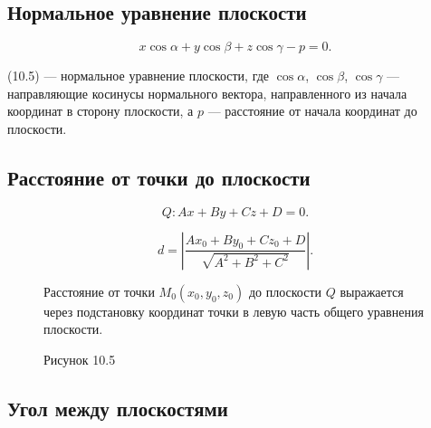\documentclass[12pt,a4paper]{article}
\begin{document}
\subsection*{\textbf{Нормальное уравнение плоскости}}

\begin{equation}
  x\cos\alpha+y\cos\beta+z\cos\gamma-p=0. \tag{10.5}
\end{equation}

(10.5) --- нормальное уравнение плоскости, где $\cos\alpha$, $\cos\beta$,
$\cos\gamma$ --- направляющие косинусы нормального вектора,
направленного из начала координат в сторону плоскости, а $p$ ---
расстояние от начала координат до плоскости.

\subsection*{\textbf{Расстояние от точки до плоскости}}

$$
Q:Ax+By+Cz+D=0.
$$

\begin{equation}
  d=\left|\frac{Ax_0+By_0+Cz_0+D}{\sqrt{A^2+B^2+C^2}}\right|. \tag{10.5a}
\end{equation}

\begin{figure}[H]
  \centering
  \begin{minipage}{0.4\textwidth}
    \centering
    \caption*{Рисунок 10.5}
  \end{minipage}%
  \begin{minipage}{0.55\textwidth}
    Расстояние от точки $M_0(x_0,y_0,z_0)$ до плоскости $Q$ выражается
    через подстановку координат точки в левую часть общего уравнения
    плоскости.
  \end{minipage}
\end{figure}

\subsection*{\textbf{Угол между плоскостями}}
\end{document}
